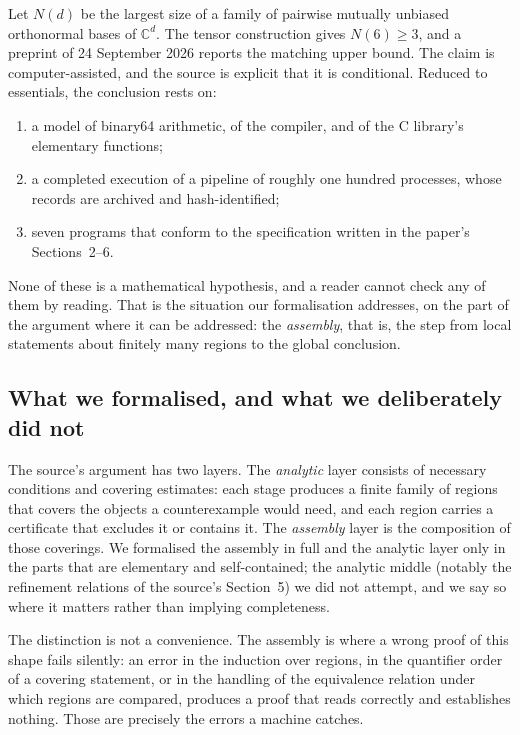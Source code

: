 \documentclass[11pt]{article}
\theoremstyle{definition}
\newcommand{\C}{\mathbb{C}}
\begin{document}
Let $N(d)$ be the largest size of a family of pairwise mutually unbiased orthonormal bases of
$\C^d$. The tensor construction gives $N(6)\ge 3$, and a preprint of 24 September 2026
\cite{source} reports the matching upper bound. The claim is computer-assisted, and the source is
explicit that it is conditional. Reduced to essentials, the conclusion rests on:
\begin{enumerate}[label=(\Alph*)]
\item a model of binary64 arithmetic, of the compiler, and of the C library's elementary functions;
\item a completed execution of a pipeline of roughly one hundred processes, whose records are
      archived and hash-identified;
\item seven programs that conform to the specification written in the paper's Sections~2--6.
\end{enumerate}
None of these is a mathematical hypothesis, and a reader cannot check any of them by reading. That
is the situation our formalisation addresses, on the part of the argument where it can be addressed:
the \emph{assembly}, that is, the step from local statements about finitely many regions to the
global conclusion.

\subsection{What we formalised, and what we deliberately did not}

The source's argument has two layers. The \emph{analytic} layer consists of necessary conditions
and covering estimates: each stage produces a finite family of regions that covers the objects a
counterexample would need, and each region carries a certificate that excludes it or contains it.
The \emph{assembly} layer is the composition of those coverings. We formalised the assembly in full
and the analytic layer only in the parts that are elementary and self-contained; the analytic middle
(notably the refinement relations of the source's Section~5) we did not attempt, and we say so where
it matters rather than implying completeness.

The distinction is not a convenience. The assembly is where a wrong proof of this shape fails
silently: an error in the induction over regions, in the quantifier order of a covering statement,
or in the handling of the equivalence relation under which regions are compared, produces a proof
that reads correctly and establishes nothing. Those are precisely the errors a machine catches.
\end{document}
